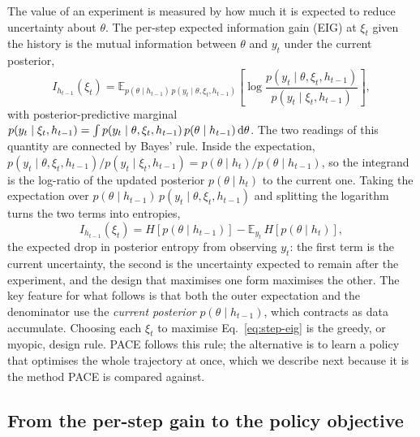 The value of an experiment is measured by how much it is expected to reduce
uncertainty about $\theta$. The per-step expected information gain (EIG) at $\xi_t$
given the history is the mutual information between $\theta$ and $y_t$ under the
current posterior,
\begin{equation}
\label{eq:step-eig}
I_{h_{t-1}}(\xi_t)
= \mathbb{E}_{p(\theta\mid h_{t-1})\,p(y_t\mid\theta,\xi_t,h_{t-1})}
\!\left[\log\frac{p(y_t\mid\theta,\xi_t,h_{t-1})}{p(y_t\mid\xi_t,h_{t-1})}\right],
\end{equation}
with posterior-predictive marginal
$p(y_t\mid\xi_t,h_{t-1})=\int p(y_t\mid\theta,\xi_t,h_{t-1})\,p(\theta\mid h_{t-1})\,\mathrm{d}\theta$.
The two readings of this quantity are connected by Bayes' rule. Inside the expectation,
$p(y_t\mid\theta,\xi_t,h_{t-1})/p(y_t\mid\xi_t,h_{t-1})=p(\theta\mid h_t)/p(\theta\mid h_{t-1})$,
so the integrand is the log-ratio of the updated posterior $p(\theta\mid h_t)$ to the
current one. Taking the expectation over $p(\theta\mid h_{t-1})\,p(y_t\mid\theta,\xi_t,h_{t-1})$
and splitting the logarithm turns the two terms into entropies,
\begin{equation}
\label{eq:eig-entropy}
I_{h_{t-1}}(\xi_t)=H[p(\theta\mid h_{t-1})]-\mathbb{E}_{y_t}\,H[p(\theta\mid h_t)],
\end{equation}
the expected drop in posterior entropy from observing $y_t$: the first term is the current
uncertainty, the second is the uncertainty expected to remain after the experiment, and the
design that maximises one form maximises the other. The key feature for
what follows is that both the outer expectation and the denominator use the
\emph{current posterior} $p(\theta\mid h_{t-1})$, which contracts as data accumulate.
Choosing each $\xi_t$ to maximise Eq.~\eqref{eq:step-eig} is the greedy, or myopic,
design rule. PACE follows this rule; the alternative is to learn a policy that
optimises the whole trajectory at once, which we describe next because it is the
method PACE is compared against.

\subsection{From the per-step gain to the policy objective}
\label{sec:m-policy}

